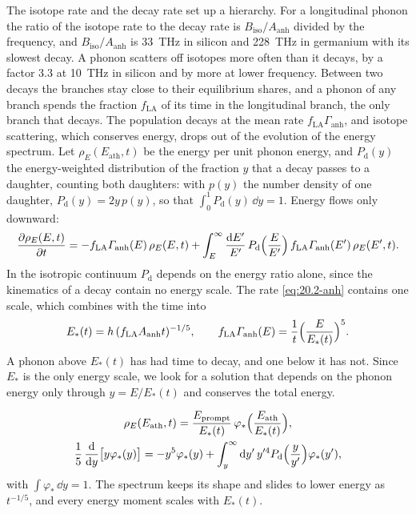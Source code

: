 The isotope rate and the decay rate set up a hierarchy. For a longitudinal phonon the ratio of the isotope rate to the decay rate is $B_{\mathrm{iso}}/A_{\mathrm{anh}}$ divided by the frequency, and $B_{\mathrm{iso}}/A_{\mathrm{anh}}$ is \SI{33}{THz} in silicon and \SI{228}{THz} in germanium with its slowest decay. A phonon scatters off isotopes more often than it decays, by a factor 3.3 at \SI{10}{THz} in silicon and by more at lower frequency. Between two decays the branches stay close to their equilibrium shares, and a phonon of any branch spends the fraction $f_{\mathrm{LA}}$ of its time in the longitudinal branch, the only branch that decays. The population decays at the mean rate $f_{\mathrm{LA}}\varGamma_{\mathrm{anh}}$, and isotope scattering, which conserves energy, drops out of the evolution of the energy spectrum. Let $\rho_E(E_{\mathrm{ath}}, t)$ be the energy per unit phonon energy, and $P_{\mathrm{d}}(y)$ the energy-weighted distribution of the fraction $y$ that a decay passes to a daughter, counting both daughters: with $p(y)$ the number density of one daughter, $P_{\mathrm{d}}(y) = 2y\,p(y)$, so that $\int_0^1P_{\mathrm{d}}(y)\,\dd y = 1$. Energy flows only downward:
\begin{equation}
  \frac{\partial\rho_E(E,t)}{\partial t} = -f_{\mathrm{LA}}\varGamma_{\mathrm{anh}}(E)\,\rho_E(E,t)
  + \int_E^\infty\frac{\mathrm{d} E'}{E'}\,P_{\mathrm{d}}\Bigl(\frac{E}{E'}\Bigr)\,f_{\mathrm{LA}}\varGamma_{\mathrm{anh}}(E')\,\rho_E(E',t) .
  \label{eq:20.2-frag}
\end{equation}
In the isotropic continuum $P_{\mathrm{d}}$ depends on the energy ratio alone, since the kinematics of a decay contain no energy scale. The rate \cref{eq:20.2-anh} contains one scale, which combines with the time into
\begin{equation}
  E_*(t) = h\,(f_{\mathrm{LA}}A_{\mathrm{anh}}t)^{-1/5} , \qquad
  f_{\mathrm{LA}}\varGamma_{\mathrm{anh}}(E) = \frac{1}{t}\Bigl(\frac{E}{E_*(t)}\Bigr)^5 .
  \label{eq:20.2-Estar}
\end{equation}
A phonon above $E_*(t)$ has had time to decay, and one below it has not. Since $E_*$ is the only energy scale, we look for a solution that depends on the phonon energy only through $y = E/E_*(t)$ and conserves the total energy.
\begin{keyresult}
\begin{equation}
  \begin{gathered}
  \rho_E(E_{\mathrm{ath}}, t) = \frac{E_{\mathrm{prompt}}}{E_*(t)}\,\varphi_*\Bigl(\frac{E_{\mathrm{ath}}}{E_*(t)}\Bigr) , \\
  \frac15\,\frac{\mathrm{d}}{\mathrm{d} y}\bigl[y\varphi_*(y)\bigr] = -y^5\varphi_*(y) + \int_y^\infty\mathrm{d} y'\,y'^4P_{\mathrm{d}}\Bigl(\frac{y}{y'}\Bigr)\varphi_*(y') ,
  \end{gathered}
  \label{eq:20.2-scaling}
\end{equation}
with $\int\varphi_*\,\dd y = 1$. The spectrum keeps its shape and slides to lower energy as $t^{-1/5}$, and every energy moment scales with $E_*(t)$.
\end{keyresult}
